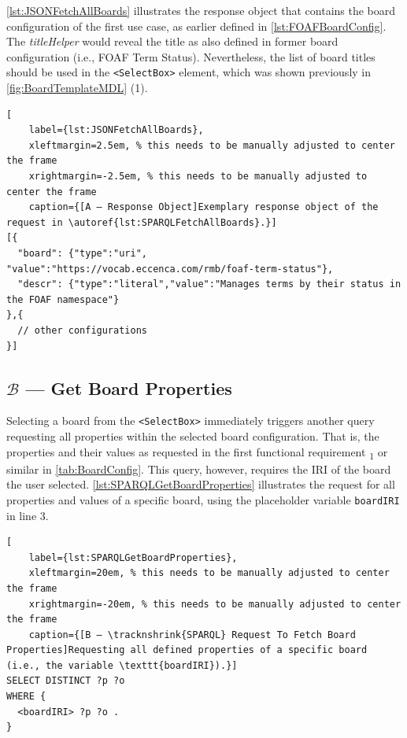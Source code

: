 \noindent \autoref{lst:JSONFetchAllBoards} illustrates the response object that contains the board configuration of the first use case, as earlier defined in \autoref{lst:FOAFBoardConfig}. The \textit{titleHelper} would reveal the title as also defined in former board configuration (i.e., \acrshort*{FOAF} Term Status). Nevertheless, the list of board titles should be used in the \texttt{<SelectBox>} element, which was shown previously in \autoref{fig:BoardTemplateMDL} (1).

\begin{spacing}{0.9}
    \lstset{language=JavaScript}
    \begin{lstlisting}[
    label={lst:JSONFetchAllBoards},
    xleftmargin=2.5em, % this needs to be manually adjusted to center the frame
    xrightmargin=-2.5em, % this needs to be manually adjusted to center the frame
    caption={[A — Response Object]Exemplary response object of the request in \autoref{lst:SPARQLFetchAllBoards}.}]
[{
  "board": {"type":"uri",    "value":"https://vocab.eccenca.com/rmb/foaf-term-status"},
  "descr": {"type":"literal","value":"Manages terms by their status in the FOAF namespace"}
},{ 
  // other configurations
}]
\end{lstlisting}
\end{spacing}

\vspace*{-1.55em}


\subsection[B — Get Board Properties]{\(\mathcal{B}\) — Get Board Properties}\label{ssec:QS-B}


Selecting a board from the \texttt{<SelectBox>} immediately triggers another query requesting all properties within the selected board configuration. That is, the properties and their values as requested in the first functional requirement \textsubscript{1} or similar in \autoref{tab:BoardConfig}. This query, however, requires the \acrshort*{IRI} of the board the user selected. \autoref{lst:SPARQLGetBoardProperties} illustrates the  request for all properties and values of a specific board, using the placeholder variable \texttt{boardIRI} in line 3.


\begin{spacing}{0.9}
    \lstset{language=SPARQL,escapechar=|}
    \begin{lstlisting}[
    label={lst:SPARQLGetBoardProperties},
    xleftmargin=20em, % this needs to be manually adjusted to center the frame
    xrightmargin=-20em, % this needs to be manually adjusted to center the frame
    caption={[B — \tracknshrink{SPARQL} Request To Fetch Board Properties]Requesting all defined properties of a specific board (i.e., the variable \texttt{boardIRI}).}]
SELECT DISTINCT ?p ?o
WHERE {
  <boardIRI> ?p ?o .
}
\end{lstlisting}
\end{spacing}

